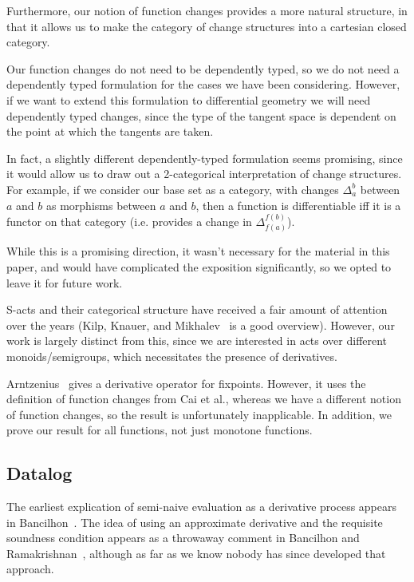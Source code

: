 Furthermore, our notion of function changes provides a more natural structure,
in that it allows us to make the category of change structures into a cartesian
closed category.

Our function changes do not need to be dependently typed, so we do not need a
dependently typed formulation for the cases we have been considering. However,
if we want to extend this formulation to differential geometry we will need
dependently typed changes, since the type of the tangent space is
dependent on the point at which the tangents are taken.

In fact, a slightly different dependently-typed formulation seems promising, since it would allow us
to draw out a 2-categorical interpretation of change structures. For example, if
we consider our base set as a category, with changes $\Delta_a^b$ between $a$
and $b$ as morphisms between $a$ and $b$, then a function is
differentiable iff it is a functor on that category (i.e. provides a change in $\Delta_{f(a)}^{f(b)}$).

While this is a promising direction, it wasn't necessary for the material in
this paper, and would have complicated the exposition significantly, so we opted
to leave it for future work.

S-acts and their categorical structure have received a fair amount of attention
over the years (Kilp, Knauer, and Mikhalev~\cite{kilp2000monoids} is a good overview). However, our work
is largely distinct from this, since we are interested in acts over different
monoids/semigroups, which necessitates the presence of derivatives.

Arntzenius~\cite{arntz2017fixpoints} gives a derivative operator for fixpoints. However,
it uses the definition of function changes from Cai et al., whereas
we have a different notion of function changes, so the result is unfortunately
inapplicable. In addition, we prove our result for all functions, not just
monotone functions.

\subsection{Datalog}

The earliest explication of semi-naive evaluation as a derivative process
appears in Bancilhon~\cite{bancilhon1986naive}. The idea of using an approximate derivative
and the requisite soundness condition appears as a throwaway comment in
Bancilhon and Ramakrishnan~\cite{bancilhon1986amateur}, although as far as we know nobody has since
developed that approach. 

